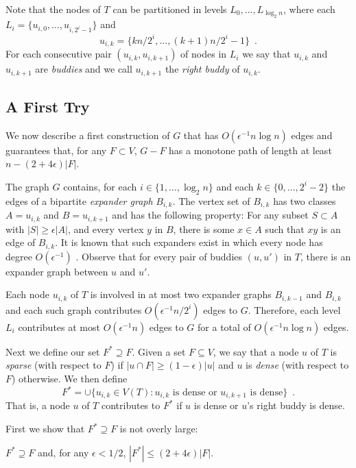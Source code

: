 \documentclass{patmorin}
\begin{document}
Note that the nodes of $T$ can be partitioned in levels $L_0,\ldots,L_{\log_2 n}$, where each $L_i=\{u_{i,0},\ldots,u_{i,2^i-1}\}$ and
\[
	u_{i,k} = \{kn/2^i,\ldots,(k+1)n/2^{i}-1\} \enspace .
\]
For each consecutive pair $(u_{i,k},u_{i,k+1})$ of nodes in $L_i$ we say
that $u_{i,k}$ and $u_{i,k+1}$ are \emph{buddies} and we call $u_{i,k+1}$
the \emph{right buddy} of $u_{i,k}$.

\subsection{A First Try}

We now describe a first construction of $G$ that has $O(\epsilon^{-1}n\log
n)$ edges and guarantees that, for any $F\subset V$,  $G-F$ has a monotone
path of length at least $n-(2+4\epsilon)|F|$.

The graph $G$ contains, for each $i\in\{1,\ldots,\log_2 n\}$ and each
$k\in\{0,\ldots,2^{i}-2\}$ the edges of a bipartite \emph{expander graph}
$B_{i,k}$.  The vertex set of $B_{i,k}$ has two classes $A=u_{i,k}$ and
$B=u_{i,k+1}$ and has the following property:  For any subset $S\subset
A$ with $|S|\ge \epsilon |A|$, and every vertex $y$ in $B$, there is
some $x\in A$ such that $xy$ is an edge of $B_{i,k}$. It is known that
such expanders exist in which every node has degree $O(\epsilon^{-1})$
\cite{X}.  Observe that for every pair of buddies $(u,u')$ in $T$,
there is an expander graph between $u$ and $u'$.

Each node $u_{i,k}$ of $T$ is involved in at most two expander
graphs $B_{i,k-1}$ and $B_{i,k}$ and each such graph contributes
$O(\epsilon^{-1}n/2^{i})$ edges to $G$.  Therefore, each level $L_i$
contributes at most $O(\epsilon^{-1} n)$ edges to $G$ for a total of
$O(\epsilon^{-1}n\log n)$ edges.  

Next we define our set $F^*\supseteq F$.  Given a set $F\subseteq V$,
we say that a node $u$ of $T$ is \emph{sparse} (with respect to $F$)
if $|u\cap F| \ge (1-\epsilon)|u|$ and $u$ is \emph{dense} (with respect
to $F$) otherwise.  We then define
\[
	F^* = \cup\{ u_{i,k}\in V(T): \text{$u_{i,k}$ is dense or $u_{i,k+1}$ is dense} \} \enspace .
\]
That is, a node $u$ of $T$ contributes to $F^*$ if $u$ is dense or $u$'s
right buddy is dense.

First we show that $F^*\supseteq F$ is not overly large:

\begin{clm}
  $F^*\supseteq F$ and, for any $\epsilon < 1/2$, $|F^*|\le (2+4\epsilon)|F|$.
\end{clm}
\end{document}
